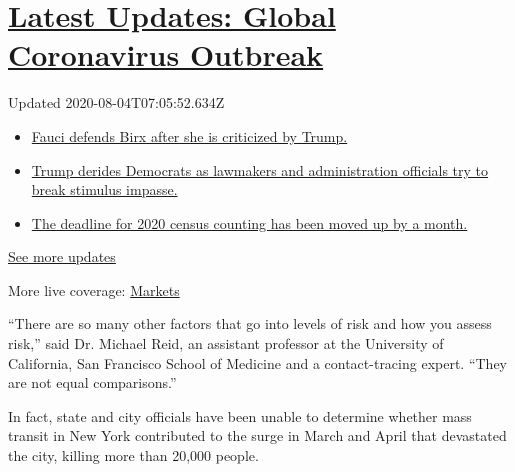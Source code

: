 \hypertarget{latest-updates-global-coronavirus-outbreak}{%
\section{\texorpdfstring{\href{https://www.nytimes.com/2020/08/03/world/coronavirus-covid-19.html?action=click\&pgtype=Article\&state=default\&region=MAIN_CONTENT_1\&context=storylines_live_updates}{Latest
Updates: Global Coronavirus
Outbreak}}{Latest Updates: Global Coronavirus Outbreak}}\label{latest-updates-global-coronavirus-outbreak}}

Updated 2020-08-04T07:05:52.634Z

\begin{itemize}
\tightlist
\item
  \href{https://www.nytimes.com/2020/08/03/world/coronavirus-covid-19.html?action=click\&pgtype=Article\&state=default\&region=MAIN_CONTENT_1\&context=storylines_live_updates\#link-4547638f}{Fauci
  defends Birx after she is criticized by Trump.}
\item
  \href{https://www.nytimes.com/2020/08/03/world/coronavirus-covid-19.html?action=click\&pgtype=Article\&state=default\&region=MAIN_CONTENT_1\&context=storylines_live_updates\#link-15e7f995}{Trump
  derides Democrats as lawmakers and administration officials try to
  break stimulus impasse.}
\item
  \href{https://www.nytimes.com/2020/08/03/world/coronavirus-covid-19.html?action=click\&pgtype=Article\&state=default\&region=MAIN_CONTENT_1\&context=storylines_live_updates\#link-e5a2cda}{The
  deadline for 2020 census counting has been moved up by a month.}
\end{itemize}

\href{https://www.nytimes.com/2020/08/03/world/coronavirus-covid-19.html?action=click\&pgtype=Article\&state=default\&region=MAIN_CONTENT_1\&context=storylines_live_updates}{See
more updates}

More live coverage:
\href{https://www.nytimes.com/live/2020/08/03/business/stock-market-today-coronavirus?action=click\&pgtype=Article\&state=default\&region=MAIN_CONTENT_1\&context=storylines_live_updates}{Markets}

``There are so many other factors that go into levels of risk and how
you assess risk,'' said Dr. Michael Reid, an assistant professor at the
University of California, San Francisco School of Medicine and a
contact-tracing expert. ``They are not equal comparisons.''

In fact, state and city officials have been unable to determine whether
mass transit in New York contributed to the surge in March and April
that devastated the city, killing more than 20,000 people.

